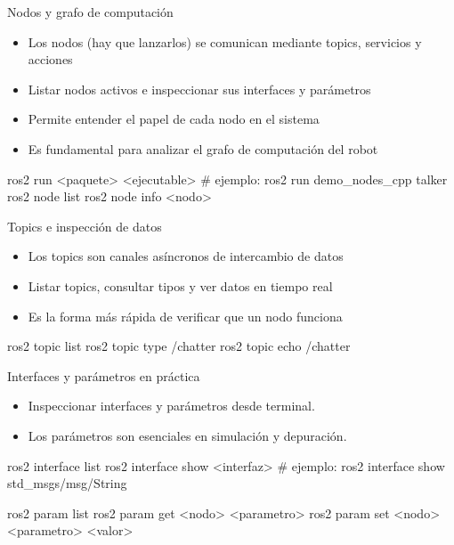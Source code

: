 \documentclass[aspectratio=169]{beamer}
\begin{document}
\begin{frame}[fragile]{Nodos y grafo de computación}
\small
\begin{itemize}
  \item Los nodos (hay que lanzarlos) se comunican mediante topics, servicios y acciones
  \item Listar nodos activos e inspeccionar sus interfaces y parámetros
  \item Permite entender el papel de cada nodo en el sistema
  \item Es fundamental para analizar el grafo de computación del robot
\end{itemize}
\vspace{2mm}
\begin{terminal}
ros2 run <paquete> <ejecutable> # ejemplo: ros2 run demo_nodes_cpp talker
ros2 node list
ros2 node info <nodo>
\end{terminal}
\end{frame}

\begin{frame}[fragile]{Topics e inspección de datos}
\small
\begin{itemize}
  \item Los topics son canales asíncronos de intercambio de datos
  \item Listar topics, consultar tipos y ver datos en tiempo real
  \item Es la forma más rápida de verificar que un nodo funciona
\end{itemize}
\vspace{2mm}
\begin{terminal}
ros2 topic list
ros2 topic type /chatter
ros2 topic echo /chatter
\end{terminal}
\end{frame}

\begin{frame}[fragile]{Interfaces y parámetros en práctica}
\small
\begin{itemize}
  \item Inspeccionar interfaces y parámetros desde terminal.
  \item Los parámetros son esenciales en simulación y depuración.
\end{itemize}
\vspace{2mm}
\begin{terminal}
ros2 interface list
ros2 interface show <interfaz> # ejemplo: ros2 interface show std_msgs/msg/String

ros2 param list
ros2 param get <nodo> <parametro>
ros2 param set <nodo> <parametro> <valor>
\end{terminal}
\end{frame}
\end{document}
